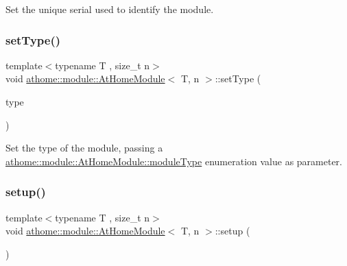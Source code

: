 Set the unique serial used to identify the module. \mbox{\label{classathome_1_1module_1_1_at_home_module_a2f9255b84d9661f7825aca39936f61f1}} 
\subsubsection{\texorpdfstring{set\+Type()}{setType()}}
{\footnotesize\ttfamily template$<$typename T , size\+\_\+t n$>$ \\
void \mbox{\hyperlink{classathome_1_1module_1_1_at_home_module}{athome\+::module\+::\+At\+Home\+Module}}$<$ T, n $>$\+::set\+Type (\begin{DoxyParamCaption}\item[{\mbox{\hyperlink{classathome_1_1module_1_1_at_home_module_a5075522baeaab0de681c26a5e5f18cd3}{module\+Type}}}]{type }\end{DoxyParamCaption})\hspace{0.3cm}{\ttfamily [inline]}}

Set the type of the module, passing a \mbox{\hyperlink{classathome_1_1module_1_1_at_home_module_a5075522baeaab0de681c26a5e5f18cd3}{athome\+::module\+::\+At\+Home\+Module\+::module\+Type}} enumeration value as parameter. \mbox{\label{classathome_1_1module_1_1_at_home_module_a5354c736954a788c51e7cf25f6ccf89d}} 
\subsubsection{\texorpdfstring{setup()}{setup()}}
{\footnotesize\ttfamily template$<$typename T , size\+\_\+t n$>$ \\
void \mbox{\hyperlink{classathome_1_1module_1_1_at_home_module}{athome\+::module\+::\+At\+Home\+Module}}$<$ T, n $>$\+::setup (\begin{DoxyParamCaption}{ }\end{DoxyParamCaption})\hspace{0.3cm}{\ttfamily [inline]}}

